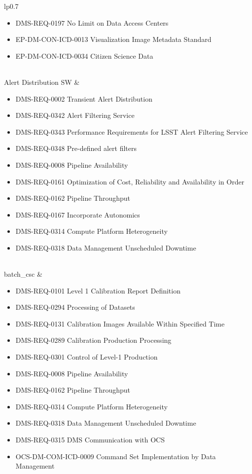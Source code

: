 \begin{xtabular}{lp{0.7\textwidth}}
\begin{itemize}
\item DMS-REQ-0197 No Limit on Data Access Centers
\item EP-DM-CON-ICD-0013 Visualization Image Metadata Standard
\item EP-DM-CON-ICD-0034 Citizen Science Data
\end{itemize} \\ \hline
Alert Distribution SW &
\begin{itemize}DMS-REQ-0004 Nightly Data Accessible Within 24 hrs
\item DMS-REQ-0002 Transient Alert Distribution
\item DMS-REQ-0342 Alert Filtering Service
\item DMS-REQ-0343 Performance Requirements for LSST Alert Filtering Service
\item DMS-REQ-0348 Pre-defined alert filters
\item DMS-REQ-0008 Pipeline Availability
\item DMS-REQ-0161 Optimization of Cost, Reliability and Availability in Order
\item DMS-REQ-0162 Pipeline Throughput
\item DMS-REQ-0167 Incorporate Autonomics
\item DMS-REQ-0314 Compute Platform Heterogeneity
\item DMS-REQ-0318 Data Management Unscheduled Downtime
\end{itemize} \\ \hline
batch_csc &
\begin{itemize}DMS-REQ-0265 Guider Calibration Data Acquisition
\item DMS-REQ-0101 Level 1 Calibration Report Definition
\item DMS-REQ-0294 Processing of Datasets
\item DMS-REQ-0131 Calibration Images Available Within Specified Time
\item DMS-REQ-0289 Calibration Production Processing
\item DMS-REQ-0301 Control of Level-1 Production
\item DMS-REQ-0008 Pipeline Availability
\item DMS-REQ-0162 Pipeline Throughput
\item DMS-REQ-0314 Compute Platform Heterogeneity
\item DMS-REQ-0318 Data Management Unscheduled Downtime
\item DMS-REQ-0315 DMS Communication with OCS
\item OCS-DM-COM-ICD-0009 Command Set Implementation by Data Management

\end{itemize}
\end{xtabular}
